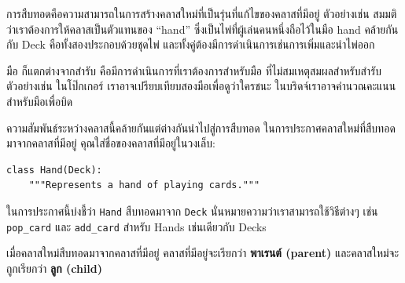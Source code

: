 การสืบทอดคือความสามารถในการสร้างคลาสใหม่ที่เป็นรุ่นที่แก้ไขของคลาสที่มีอยู่ ตัวอย่างเช่น สมมติว่าเราต้องการให้คลาสเป็นตัวแทนของ ``hand'' 
ซึ่งเป็นไพ่ที่ผู้เล่นคนหนึ่งถือไว้ในมือ hand คล้ายกันกับ Deck คือทั้งสองประกอบด้วยชุดไพ่ และทั้งคู่ต้องมีการดำเนินการเช่นการเพิ่มและนำไพ่ออก



มือ ก็แตกต่างจากสำรับ คือมีการดำเนินการที่เราต้องการสำหรับมือ ที่ไม่สมเหตุสมผลสำหรับสำรับ 
ตัวอย่างเช่น ในโป๊กเกอร์ เราอาจเปรียบเทียบสองมือเพื่อดูว่าใครชนะ ในบริดจ์เราอาจคำนวณคะแนนสำหรับมือเพื่อบิด



ความสัมพันธ์ระหว่างคลาสนี้คล้ายกันแต่ต่างกันนำไปสู่การสืบทอด ในการประกาศคลาสใหม่ที่สืบทอดมาจากคลาสที่มีอยู่ คุณใส่ชื่อของคลาสที่มีอยู่ในวงเล็บ:


\begin{verbatim}
class Hand(Deck):
    """Represents a hand of playing cards."""
\end{verbatim}
%

ในการประกาศนี้บ่งชี้ว่า {\tt Hand} สืบทอดมาจาก {\tt Deck} นั่นหมายความว่าเราสามารถใช้วิธีต่างๆ 
เช่น \verb"pop_card" และ \verb"add_card" สำหรับ Hands เช่นเดียวกับ Decks

เมื่อคลาสใหม่สืบทอดมาจากคลาสที่มีอยู่ คลาสที่มีอยู่จะเรียกว่า {\bf พาเรนต์ (parent)} และคลาสใหม่จะถูกเรียกว่า {\bf ลูก (child)}




